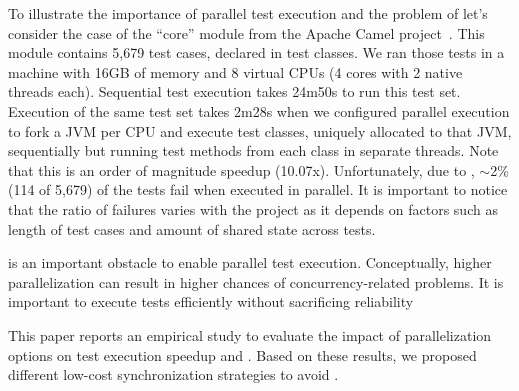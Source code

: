 To illustrate the importance of parallel test execution and the
problem of \pef{} let's consider the case of the ``core'' module from
the Apache Camel project~\cite{apache-camel-web}.  This module
contains 5,679 test cases, declared in  test classes.  We ran
those tests in a machine with 16GB of memory and 8 virtual CPUs (4
cores with 2 native threads each).  Sequential test execution takes
24m50s to run this test set.  Execution of the same test set takes
2m28s when we configured parallel execution to fork a JVM per CPU and
execute test classes, uniquely allocated to that JVM, sequentially but
running test methods from each class in separate threads.  Note that
this is an order of magnitude speedup (10.07x).
Unfortunately, due to \pef{}, $\sim$2\% (114 of 5,679) of the tests
fail when executed in parallel.  It is important to notice that the
ratio of failures varies with the project as it depends on factors
such as length of test cases and amount of shared state across tests.

\pef{} is an important obstacle to enable parallel test execution.
Conceptually, higher parallelization can result in higher chances of
concurrency-related problems.  It is important to execute tests
efficiently without sacrificing reliability

This paper reports an empirical study to evaluate the impact of
parallelization options on test execution speedup and \pef{}. Based on
these results, we proposed different low-cost synchronization
strategies to avoid \pef{}.

